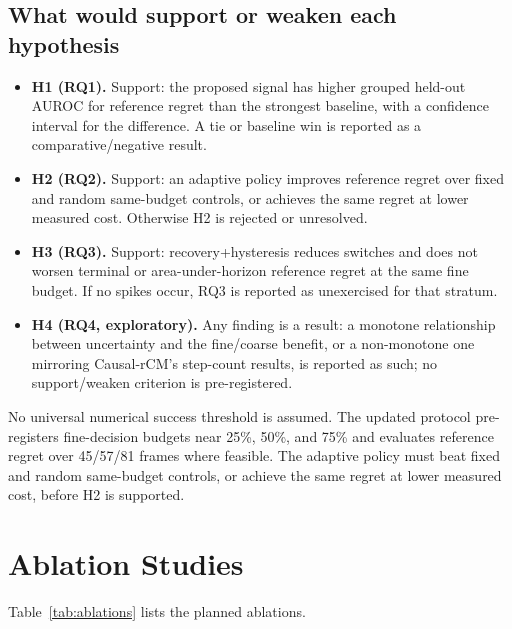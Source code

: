 \documentclass[11pt,a4paper]{article}
\begin{document}
\subsection{What would support or weaken each hypothesis}

\begin{itemize}[leftmargin=1.6em, itemsep=2pt]
\item \textbf{H1 (RQ1).} Support: the proposed signal has higher grouped held-out AUROC for reference regret than the strongest baseline, with a confidence interval for the difference. A tie or baseline win is reported as a comparative/negative result.
\item \textbf{H2 (RQ2).} Support: an adaptive policy improves reference regret over fixed and random same-budget controls, or achieves the same regret at lower measured cost. Otherwise H2 is rejected or unresolved.
\item \textbf{H3 (RQ3).} Support: recovery+hysteresis reduces switches and does not worsen terminal or area-under-horizon reference regret at the same fine budget. If no spikes occur, RQ3 is reported as unexercised for that stratum.
\item \textbf{H4 (RQ4, exploratory).} Any finding is a result: a monotone relationship between uncertainty and the fine/coarse benefit, or a non-monotone one mirroring Causal-rCM's step-count results, is reported as such; no support/weaken criterion is pre-registered.
\end{itemize}

No universal numerical success threshold is assumed. The updated protocol pre-registers fine-decision budgets near 25\%, 50\%, and 75\% and evaluates reference regret over 45/57/81 frames where feasible. The adaptive policy must beat fixed and random same-budget controls, or achieve the same regret at lower measured cost, before H2 is supported.

\section{Ablation Studies}\label{sec:ablations}

Table~\ref{tab:ablations} lists the planned ablations.
\end{document}
